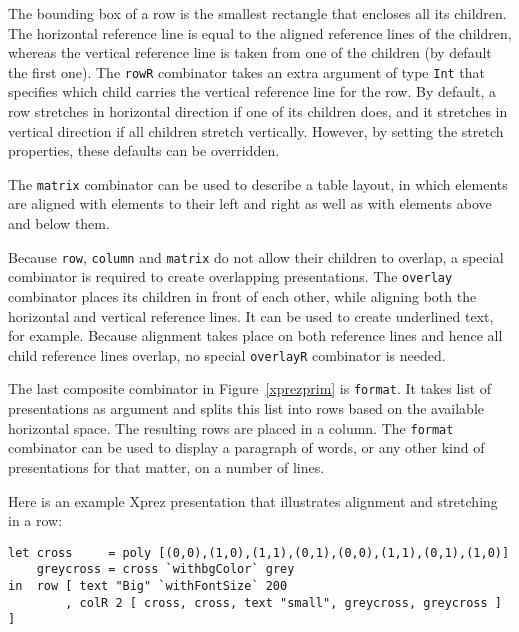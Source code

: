 \begin{center}
\end{center}

The bounding box of a row is the smallest rectangle that encloses all its children. The horizontal reference line is equal to the aligned reference lines of the children, whereas the vertical reference line is taken from one of the children (by default the first one). The \texttt{rowR} combinator takes an extra argument of type \texttt{Int} that specifies which child carries the vertical reference line for the row. \texttt{}By default, a row stretches in horizontal direction if one of its children does, and it stretches in vertical direction if all children stretch vertically. However, by setting the stretch properties, these defaults can be overridden. 

The \texttt{matrix} combinator can be used to describe a table layout, in which elements are aligned with elements to their left and right as well as with elements above and below them. 

Because \texttt{row}, \texttt{column} and \texttt{matrix} do not allow their children to overlap, a special combinator is required to create overlapping presentations. The \texttt{overlay} combinator places its children in front of each other, while aligning both the horizontal and vertical reference lines. It can be used to create underlined text, for example. Because alignment takes place on both reference lines and hence all child reference lines overlap, no special \texttt{overlayR} combinator is needed. 

The last composite combinator in Figure~\ref{xprezprim} is \texttt{format}. It takes list of presentations as argument and splits this list into rows based on the available horizontal space. The resulting rows are placed in a column. The \texttt{format} combinator can be used to display a paragraph of words, or any other kind of presentations for that matter, on a number of lines. 

\fromHere

Here is an example {\sc Xprez} presentation that illustrates alignment and stretching in a row:

\begin{small}
\begin{verbatim}
let cross     = poly [(0,0),(1,0),(1,1),(0,1),(0,0),(1,1),(0,1),(1,0)]
    greycross = cross `withbgColor` grey
in  row [ text "Big" `withFontSize` 200
        , colR 2 [ cross, cross, text "small", greycross, greycross ] ] 
\end{verbatim}
\end{small}

